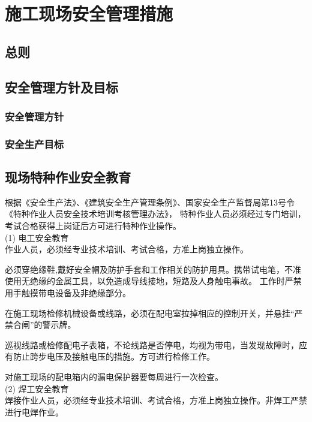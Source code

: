 \section{施工现场安全管理措施}
\subsection{总则}

\subsection{安全管理方针及目标}
\subsubsection{安全管理方针}

\subsubsection{安全生产目标}

\subsection{现场特种作业安全教育}

根据《安全生产法》、《建筑安全生产管理条例》、国家安全生产监督局第13号令《特种作业人员安全技术培训考核管理办法》，
特种作业人员必须经过专门培训，考试合格获得上岗证后方可进行特种作业操作。\\

(1) 电工安全教育\\

 作业人员，必须经专业技术培训、考试合格，方准上岗独立操作。

 必须穿绝缘鞋,戴好安全帽及防护手套和工作相关的防护用具。携带试电笔，不准使用无绝缘的金属工具，以免造成导线接地，短路及人身触电事故。
工作时严禁用手触摸带电设备及非绝缘部分。

 在施工现场检修机械设备或线路，必须在配电室拉掉相应的控制开关，并悬挂“严禁合闸”的警示牌。

 巡视线路或检修配电子表箱，不论线路是否停电，均视为带电，当发现故障时，应有防止跨步电压及接触电压的措施。方可进行检修工作。

 对施工现场的配电箱内的漏电保护器要每周进行一次检查。\\


(2) 焊工安全教育\\

 焊接作业人员，必须经专业技术培训、考试合格，方准上岗独立操作。非焊工严禁进行电焊作业。

